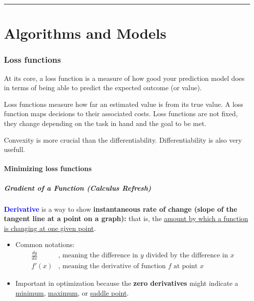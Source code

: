 \documentclass[12pt, a4paper]{article}
\let\stdsection\section
\renewcommand\section{\newpage\stdsection} %
\begin{document}
\begin{center}\rule{3in}{0.4pt}\end{center}
















\newpage
\part{Algorithms and Models}
\newpage











\section{Loss functions}\label{loss-functions}


At its core, a loss function is a measure of how good your prediction model does in terms of being able to predict the expected outcome (or value).

Loss functions measure how far an estimated value is from its true value. A loss function maps decisions to their associated costs. Loss functions are not fixed, they change depending on the task in hand and the goal to be met.

Convexity is more crucial than the differentiability.
Differentiability is also very usefull.







\subsection{Minimizing loss functions}\label{minimizing-loss-functions}

\subsubsection{Gradient of a Function (Calculus Refresh)}

\textcolor{blue}{\textbf{Derivative}} is a way to show \textbf{instantaneous rate of change (slope of the tangent line at a point on a graph):} that is, the \uline{amount by which a function is changing at one given point}.
\begin{itemize}
  \item Common notations:
  \begin{align*}
    \frac{d y}{d x} & \text{, meaning the difference in $y$ divided by the difference in $x$} \\
    f'(x) & \text{, meaning the derivative of function $f$ at point $x$}
  \end{align*}
  \item Important in optimization because the \textbf{zero derivatives} might indicate a \uline{minimum}, \uline{maximum}, or \uline{saddle point}.
\end{itemize}
\end{document}
